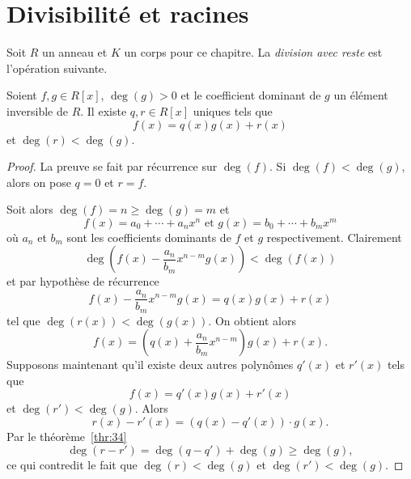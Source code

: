 \section{Divisibilité et racines} 
\label{sec:divisibilite}
Soit $R$ un anneau et $K$ un corps pour ce chapitre. La \emph{division avec reste} est l'opération suivante. 

\begin{theorem}
  \label{thr:33}
  Soient $f,g \in R[x]$, $\deg(g) >0$ et le coefficient dominant de $g$ un élément  inversible de $R$.   Il existe $q,r \in R[x]$ uniques tels que 
  \begin{displaymath}
    f(x) = q(x) g(x) + r(x) 
  \end{displaymath}
  et $\deg(r) < \deg(g)$. 
\end{theorem}


\begin{proof}
  La preuve se fait par récurrence sur $\deg(f)$. Si $\deg(f) < \deg(g)$, alors on pose $q = 0$ et $r = f$.

Soit alors $\deg(f) = n \geq \deg(g)=m$ et 
\begin{displaymath}
  f(x) = a_0+ \cdots +a_n x^n \text{ et } g(x) = b_0 + \cdots + b_m x^m 
\end{displaymath}
où $a_n$ et $b_m$ sont les coefficients dominants de $f$ et $g$ respectivement. 
Clairement 
\begin{displaymath}
  \deg\left( f(x) - \frac{a_n}{ b_m } x^{n-m} g(x) \right) < \deg(f(x))
\end{displaymath}
et par hypothèse de récurrence 
\begin{displaymath}
  f(x) - \frac{a_n}{ b_m } x^{n-m} g(x)  = q(x) g(x) + r(x) 
\end{displaymath}
tel que $\deg(r(x)) < \deg(g(x))$. On  obtient alors
\begin{displaymath}
  f(x) = \left(q(x) + \frac{a_n}{ b_m } x^{n-m} \right) g(x) + r(x). 
\end{displaymath}
%
Supposons maintenant qu'il existe deux autres polynômes $q'(x)$ et $r'(x)$ tels que 
\begin{displaymath}
    f(x) = q'(x) g(x) + r'(x) 
  \end{displaymath}
  et $\deg(r') < \deg(g)$. 
Alors 
\begin{displaymath}
   r(x) - r'(x) = (q(x) - q'(x)) ⋅ g(x). 
\end{displaymath}
Par le théorème~\ref{thr:34}
\begin{displaymath}
 \deg( r - r')  = \deg(q - q') + \deg(g) \geq \deg(g), 
\end{displaymath}
ce qui contredit le fait que $\deg(r) < \deg(g)$ et $\deg(r') < \deg(g)$. 
\end{proof}


